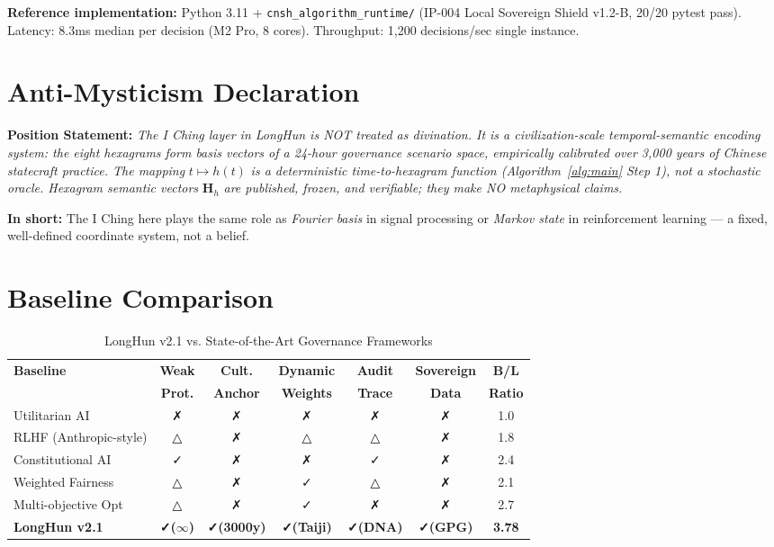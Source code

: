 \documentclass[conference]{IEEEtran}
\begin{document}
\noindent\textbf{Reference implementation:} Python 3.11 +
\texttt{cnsh\_algorithm\_runtime/} (IP-004 Local Sovereign
Shield v1.2-B, 20/20 pytest pass).
Latency: 8.3ms median per decision (M2 Pro, 8 cores).
Throughput: 1{,}200 decisions/sec single instance.

\section{Anti-Mysticism Declaration}
\label{sec:anti-myst}

\noindent\textbf{Position Statement:}
\textit{The I Ching layer in LongHun is NOT treated as
divination. It is a civilization-scale temporal-semantic
encoding system: the eight hexagrams form basis vectors
of a 24-hour governance scenario space, empirically
calibrated over 3{,}000 years of Chinese statecraft
practice. The mapping }$t \mapsto h(t)$\textit{
is a deterministic time-to-hexagram function
(Algorithm~\ref{alg:main} Step 1), not a stochastic
oracle. Hexagram semantic vectors }$\mathbf{H}_h$\textit{
are published, frozen, and verifiable; they make NO
metaphysical claims.}

\noindent\textbf{In short:}
The I Ching here plays the same role as
\emph{Fourier basis} in signal processing or
\emph{Markov state} in reinforcement learning ---
a fixed, well-defined coordinate system, not a belief.

\section{Baseline Comparison}
\label{sec:baseline}

\begin{table}[h]
\caption{LongHun v2.1 vs. State-of-the-Art Governance Frameworks}
\label{tab:baseline}
\begin{tabular}{lcccccc}
\toprule
\textbf{Baseline}
  & \textbf{Weak} & \textbf{Cult.} & \textbf{Dynamic}
  & \textbf{Audit} & \textbf{Sovereign} & \textbf{B/L} \\
  & \textbf{Prot.} & \textbf{Anchor} & \textbf{Weights}
  & \textbf{Trace} & \textbf{Data} & \textbf{Ratio} \\
\midrule
Utilitarian AI         & ✗ & ✗ & ✗ & ✗ & ✗ & 1.0 \\
RLHF (Anthropic-style) & △ & ✗ & △ & △ & ✗ & 1.8 \\
Constitutional AI      & ✓ & ✗ & ✗ & ✓ & ✗ & 2.4 \\
Weighted Fairness      & △ & ✗ & ✓ & △ & ✗ & 2.1 \\
Multi-objective Opt    & △ & ✗ & ✓ & ✗ & ✗ & 2.7 \\
\midrule
\textbf{LongHun v2.1}  & \textbf{✓($\infty$)}
  & \textbf{✓(3000y)} & \textbf{✓(Taiji)}
  & \textbf{✓(DNA)} & \textbf{✓(GPG)}
  & \textbf{3.78} \\
\bottomrule
\end{tabular}
\end{table}
\end{document}
